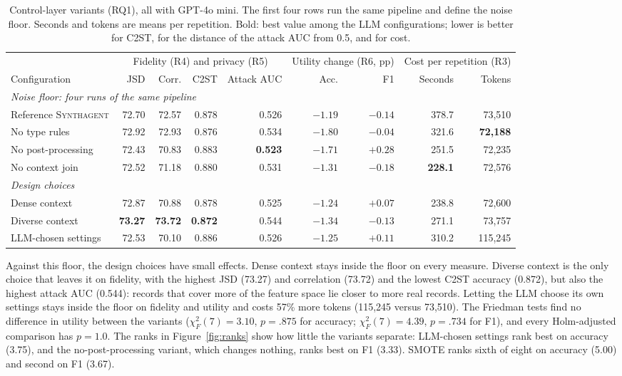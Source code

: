 \documentclass[conference]{IEEEtran}
\newcommand{\system}{\textsc{Synthagent}\xspace}
\newcommand{\best}[1]{\textbf{#1}}
\begin{document}
\begin{table}[t]
\centering
\caption{Control-layer variants (RQ1), all with GPT-4o mini. The first four rows run the same pipeline and define the noise floor. Seconds and tokens are means per repetition. Bold: best value among the LLM configurations; lower is better for C2ST, for the distance of the attack AUC from 0.5, and for cost.}
\label{tab:ablation}
\footnotesize
\begin{tabular*}{\textwidth}{@{\extracolsep{\fill}}lrrrrrrrr@{}}
\toprule
& \multicolumn{4}{c}{Fidelity (R4) and privacy (R5)} & \multicolumn{2}{c}{Utility change (R6, pp)} & \multicolumn{2}{c}{Cost per repetition (R3)} \\
\cmidrule(lr){2-5}\cmidrule(lr){6-7}\cmidrule(l){8-9}
Configuration & JSD & Corr. & C2ST & Attack AUC & Acc. & F1 & Seconds & Tokens \\
\midrule
\multicolumn{9}{l}{\textit{Noise floor: four runs of the same pipeline}}\\
Reference \system & 72.70 & 72.57 & 0.878 & 0.526 & \best{$-1.19$} & $-0.14$ & 378.7 & 73,510 \\
No type rules & 72.92 & 72.93 & 0.876 & 0.534 & $-1.80$ & $-0.04$ & 321.6 & \best{72,188} \\
No post-processing & 72.43 & 70.83 & 0.883 & \best{0.523} & $-1.71$ & \best{$+0.28$} & 251.5 & 72,235 \\
No context join & 72.52 & 71.18 & 0.880 & 0.531 & $-1.31$ & $-0.18$ & \best{228.1} & 72,576 \\
\midrule
\multicolumn{9}{l}{\textit{Design choices}}\\
Dense context & 72.87 & 70.88 & 0.878 & 0.525 & $-1.24$ & $+0.07$ & 238.8 & 72,600 \\
Diverse context & \best{73.27} & \best{73.72} & \best{0.872} & 0.544 & $-1.34$ & $-0.13$ & 271.1 & 73,757 \\
LLM-chosen settings & 72.53 & 70.10 & 0.886 & 0.526 & $-1.25$ & $+0.11$ & 310.2 & 115,245 \\
\bottomrule
\end{tabular*}
\end{table}

Against this floor, the design choices have small effects. Dense context stays inside the floor on every measure. Diverse context is the only choice that leaves it on fidelity, with the highest JSD (73.27) and correlation (73.72) and the lowest C2ST accuracy (0.872), but also the highest attack AUC (0.544): records that cover more of the feature space lie closer to more real records. Letting the LLM choose its own settings stays inside the floor on fidelity and utility and costs 57\% more tokens (115,245 versus 73,510). The Friedman tests find no difference in utility between the variants ($\chi^2_F(7)=3.10$, $p=.875$ for accuracy; $\chi^2_F(7)=4.39$, $p=.734$ for F1), and every Holm-adjusted comparison has $p=1.0$. The ranks in Figure~\ref{fig:ranks} show how little the variants separate: LLM-chosen settings rank best on accuracy (3.75), and the no-post-processing variant, which changes nothing, ranks best on F1 (3.33). SMOTE ranks sixth of eight on accuracy (5.00) and second on F1 (3.67).
\end{document}
